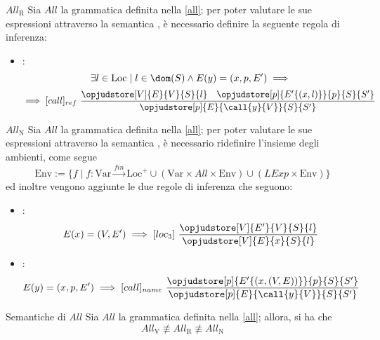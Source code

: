 \documentclass[a4paper, 12pt]{report}
\begin{document}
    \begin{framedprop}[label={all r}]{$All_\mathrm{R}$}
        Sia $All$ la grammatica definita nella \cref{all}; per poter valutare le sue espressioni attraverso la semantica , è necessario definire la seguente regola di inferenza: 

        \begin{itemize}
            \item {}: $$\exists l \in \mathrm{Loc} \mid l \in \dom(S) \land E(y) = (x, p, E') \implies$$ $$\implies [call]_{ref} \ \dfrac{\opjudstore[V]{E}{V}{S}{l} \quad \opjudstore[p]{E'\{(x,l)\}}{p}{S}{S'}}{\opjudstore[p]{E}{\call{y}{V}}{S}{S'}}$$
        \end{itemize}
    \end{framedprop}

    \begin{framedprop}[label={all n}]{$All_\mathrm{N}$}
        Sia $All$ la grammatica definita nella \cref{all}; per poter valutare le sue espressioni attraverso la semantica , è necessario ridefinire l'insieme degli ambienti, come segue $$\mathrm{Env} := \{f \mid f : \mathrm{Var} \xrightarrow{fin} \mathrm{Loc}^+ \cup (\mathrm{Var} \times All \times \mathrm{Env}) \cup (LExp \times \mathrm{Env})\}$$ ed inoltre vengono aggiunte le due regole di inferenza che seguono:

        \begin{itemize}
            \item {}: $$E(x) = (V, E') \implies [loc_3] \ \dfrac{\opjudstore[V]{E'}{V}{S}{l}}{\opjudstore[V]{E}{x}{S}{l}}$$
            \item {}: $$E(y) = (x, p, E') \implies [call]_{name} \ \dfrac{\opjudstore[p]{E'\{(x,(V,E))\}}{p}{S}{S'}}{\opjudstore[p]{E}{\call{y}{V}}{S}{S'}}$$
        \end{itemize}
    \end{framedprop}

    \begin{framedlem}{Semantiche di $All$}
        Sia $All$ la grammatica definita nella \cref{all}; allora, si ha che $$All_\mathrm{V} \not\equiv All_\mathrm{R} \not\equiv All_\mathrm{N}$$
    \end{framedlem}
    
\end{document}

